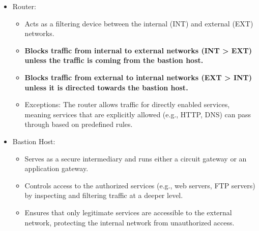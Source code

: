 \begin{itemize}
    \item Router:
    \begin{itemize}
        \item Acts as a filtering device between the internal (INT) and external (EXT) networks.
        \item \textbf{Blocks traffic from internal to external networks (INT > EXT) unless the traffic is coming from the bastion host.}
        \item \textbf{Blocks traffic from external to internal networks (EXT > INT) unless it is directed towards the bastion host.}
        \item Exceptions: The router allows traffic for directly enabled services, meaning services that are explicitly allowed (e.g., HTTP, DNS) can pass through based on predefined rules.
    \end{itemize}
    \item Bastion Host:
    \begin{itemize}
        \item Serves as a secure intermediary and runs either a circuit gateway or an application gateway.
        \item Controls access to the authorized services (e.g., web servers, FTP servers) by inspecting and filtering traffic at a deeper level.
        \item Ensures that only legitimate services are accessible to the external network, protecting the internal network from unauthorized access.
    \end{itemize}
    
\end{itemize}

